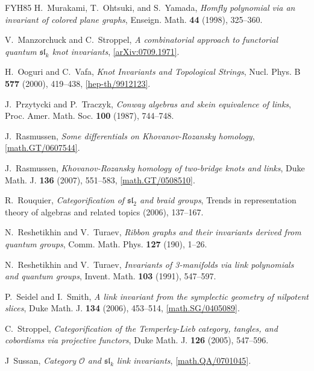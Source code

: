 \documentclass{compositio}
\theoremstyle{definition}
\numberwithin{equation}{section}
\begin{document}
\begin{thebibliography}{FYH{\etalchar{+}}85}
H.~Murakami, T.~Ohtsuki, and S.~Yamada, \emph{Homfly polynomial via an
  invariant of colored plane graphs}, Enseign. Math. \textbf{44} (1998),
  325--360.

V.~Manzorchuck and C.~Stroppel, \emph{A combinatorial approach to functorial
  quantum {$\mathfrak{sl}_k$} knot invariants},
  \href{http://arxiv.org/abs/0709.1971}{[arXiv:0709.1971]}.

H.~Ooguri and C.~Vafa, \emph{Knot {I}nvariants and {T}opological {S}trings},
  Nucl. Phys. B \textbf{577} (2000), 419--438,
  \href{http://arxiv.org/abs/hep-th/9912123}{[hep-th/9912123]}.

J.~Przytycki and P.~Traczyk, \emph{Conway algebras and skein equivalence of
  links}, Proc. Amer. Math. Soc. \textbf{100} (1987), 744--748.

J.~Rasmussen, \emph{Some differentials on {K}hovanov-{R}ozansky homology},
  \href{http://arxiv.org/abs/math/0607544}{[math.GT/0607544]}.

J.~Rasmussen, \emph{Khovanov-{R}ozansky homology of two-bridge knots and links},
  Duke Math. J. \textbf{136} (2007), 551--583,
  \href{http://arxiv.org/abs/math/0508510}{[math.GT/0508510]}.
  
R.~Rouquier, \emph{Categorification of {$\mathfrak{sl}_{2}$} and braid groups},
  Trends in representation theory of algebras and related topics (2006),
  137--167.

N.~Reshetikhin and V.~Turaev, \emph{Ribbon graphs and their invariants derived
  from quantum groups}, Comm. Math. Phys. \textbf{127} (190), 1--26.

N.~Reshetikhin and V.~Turaev, \emph{Invariants of 3-manifolds via link polynomials and quantum
  groups}, Invent. Math. \textbf{103} (1991), 547--597.

P.~Seidel and I.~Smith, \emph{A link invariant from the symplectic geometry of
  nilpotent slices}, Duke Math. J. \textbf{134} (2006), 453--514,
  \href{http://arxiv.org/abs/math/0405089}{[math.SG/0405089]}.

C.~Stroppel, \emph{Categorification of the {T}emperley-{L}ieb category,
  tangles, and cobordisms via projective functors}, Duke Math. J. \textbf{126}
  (2005), 547--596.

J~Sussan, \emph{Category {$\mathcal O$} and {$\mathfrak{sl}_k$} link
  invariants}, \href{http://arxiv.org/abs/math/0701045}{[math.QA/0701045]}.


\end{thebibliography}
\end{document}
